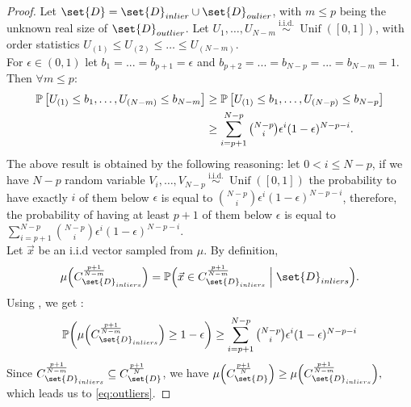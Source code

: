 \documentclass[pmlr]{jmlr}%
\begin{document}
\begin{proof}
     Let $\set{D} = \set{D}_{inlier} \cup \set{D}_{oulier}$, with $m \leq p$ being the unknown real size of $\set{D}_{outlier}$.
     Let $U_1, \ldots, U_{N-m} \stackrel{\text { i.i.d. }}{\sim} \operatorname{Unif}([0,1])$, with order statistics $U_{(1)} \leq U_{(2)} \leq \ldots \leq U_{(N-m)}$.
     \\
     For $\epsilon \in (0,1)$ let $b_1 = ...= b_{p+1} = \epsilon $ and $ b_{p+2} = ...=b_{N-p}=... = b_{N-m} = 1 $. Then %
     $\forall m \leq p$:
%
\begin{align*}
\mathbb{P}\left[U_{(1)} \leq b_1, \ldots, U_{(N-m)} \leq b_{N-m}\right] 
& \geq \mathbb{P}\left[U_{(1)} \leq b_1, \ldots, U_{(N-p)} \leq b_{N-p}\right] \\
& \geq \sum_{i = p+1}^{N-p} \tbinom{N-p}{i} \epsilon^i (1-\epsilon)^{N-p-i}.
\end{align*}
The above result is obtained by the following reasoning: let $ 0 < i \leq N-p $, if we have $N-p$ random variable $V_i, \ldots, V_{N-p} \stackrel{\text { i.i.d. }}{\sim} \operatorname{Unif}([0,1])$ the probability to have exactly $i$ of them below $\epsilon$ is equal to $\binom{N-p}{i}\epsilon^i (1-\epsilon)^{N-p-i}$, therefore, the probability of having at least $p+1$ of them below $\epsilon$ is equal to $\sum_{i = p+1}^{N-p} \binom{N-p}{i} \epsilon^i (1-\epsilon)^{N-p-i}.$
%
%
\\Let $\Vec{x}$ be an i.i.d vector sampled from $\mu$. By definition, $$ \mu \Bigl(   C_{\set{D}_{inliers}}^{\frac{p+1}{N-m}}   \Bigr) = \mathbb{P}\Bigl( \Vec{x} \in C_{\set{D}_{inliers}}^{\frac{p+1}{N-m}} \Bigm| \set{D}_{inliers}\Bigr).$$ 
Using ,  we get : 
\[ \mathbb{P}\biggl( \mu\Bigl(C_{\set{D}_{inliers}}^{\frac{p+1}{N-m}}\Bigr)  \geq 1-\epsilon \biggr) \geq \sum_{i = p+1}^{N-p} \tbinom{N-p}{i} \epsilon^i (1-\epsilon)^{N-p-i} \]
%
Since $ C_{\set{D}_{inliers}}^{\frac{p+1}{N-m}} \subseteq C_{\set{D}}^{\frac{p+1}{N}} $, we have $
     \mu\Bigl( C_{\set{D}}^{\frac{p+1}{N}}\Bigr) \geq \mu\Bigl( C_{\set{D}_{inliers}}^{\frac{p+1}{N-m}}\Bigr),
     $
which leads us %
to \eqref{eq:outliers}. 
%
\end{proof}
\end{document}
